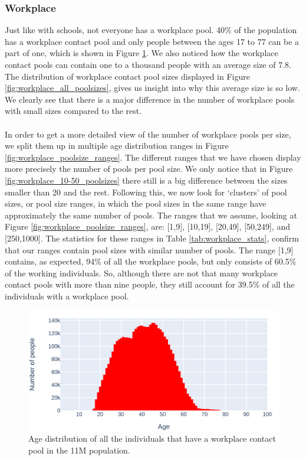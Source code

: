 \subsubsection{Workplace}
Just like with schools, not everyone has a workplace pool. 40\% of the population has a workplace contact pool and only people between the ages 17 to 77 can be a part of one, which is shown in Figure \ref{fig:workplace_age_distribution}. We also noticed how the workplace contact pools can contain one to a thousand people with an average size of 7.8. The distribution of workplace contact pool sizes displayed in Figure \ref{fig:workplace_all_poolsizes}, gives us insight into why this average size is so low. We clearly see that there is a major difference in the number of workplace pools with small sizes compared to the rest.
\\\\
In order to get a more detailed view of the number of workplace pools per size, we split them up in multiple age distribution ranges in Figure \ref{fig:workplace_poolsize_ranges}. The different ranges that we have chosen display more precisely the number of pools per pool size. We only notice that in Figure \ref{fig:workplace_10-50_poolsizes} there still is a big difference between the sizes smaller than 20 and the rest. Following this, we now look for `clusters' of pool sizes, or pool size ranges, in which the pool sizes in the same range have approximately the same number of pools. The ranges that we assume, looking at Figure \ref{fig:workplace_poolsize_ranges}, are: [1,9], [10,19], [20,49], [50,249], and [250,1000]. The statistics for these ranges in Table \ref{tab:workplace_stats}, confirm that our ranges contain pool sizes with similar number of pools. The range [1,9] contains, as expected, 94\% of all the workplace pools, but only consists of 60.5\% of the working individuals. So, although there are not that many workplace contact pools with more than nine people, they still account for 39.5\% of all the individuals with a workplace pool.

\begin{figure}
    \centering
    \includegraphics[width=.8\textwidth]{3 - Stride/fig/workplace_age_distribution.png}
    \caption{Age distribution of all the individuals that have a workplace contact pool in the 11M population.}
    \label{fig:workplace_age_distribution}
\end{figure}


